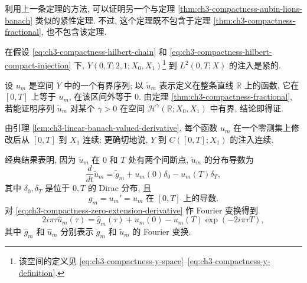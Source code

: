 利用上一条定理的方法, 可以证明另一个与定理 \ref{thm:ch3-compactness-aubin-lions-banach} 类似的紧性定理. 不过, 这个定理既不包含于定理 \ref{thm:ch3-compactness-fractional}, 也不包含该定理.

\begin{Theorem}
\label{thm:ch3-compactness-y-hilbert}
在假设 \eqref{eq:ch3-compactness-hilbert-chain} 和 \eqref{eq:ch3-compactness-hilbert-compact-injection} 下, $Y(0,T;2,1;X_0,X_1)$\footnote{该空间的定义见 \eqref{eq:ch3-compactness-y-space}--\eqref{eq:ch3-compactness-y-definition}.} 到 $L^2(0,T;X)$ 的注入是紧的.
\end{Theorem}

\begin{Proof}
设 $u_m$ 是空间 $Y$ 中的一个有界序列; 以 $\widetilde u_m$ 表示定义在整条直线 $\mathbb R$ 上的函数, 它在 $[0,T]$ 上等于 $u_m$, 在该区间外等于 $0$. 由定理 \ref{thm:ch3-compactness-fractional}, 若能证明序列 $\widetilde u_m$ 对某个 $\gamma>0$ 在空间 $\mathcal H^\gamma(\mathbb R;X_0,X_1)$ 中有界, 结论即得证.

由引理 \ref{lem:ch3-linear-banach-valued-derivative}, 每个函数 $u_m$ 在一个零测集上修改后从 $[0,T]$ 到 $X_1$ 连续; 更确切地说, $Y$ 到 $C([0,T];X_1)$ 的注入连续.

\hypertarget{chapter-03-page-203}{}
经典结果表明, 因为 $\widetilde u_m$ 在 $0$ 和 $T$ 处有两个间断点, $\widetilde u_m$ 的分布导数为
\begin{equation}
\frac d{dt}\widetilde u_m
=\widetilde g_m+u_m(0)\delta_0-u_m(T)\delta_T,
\label{eq:ch3-compactness-zero-extension-derivative}
\end{equation}
其中 $\delta_0,\delta_T$ 是位于 $0,T$ 的 Dirac 分布, 且
\begin{equation}
g_m=u_m'=u_m\text{ 在 }[0,T]\text{ 上的导数}.
\label{eq:ch3-compactness-extension-derivative-definition}
\end{equation}
对 \eqref{eq:ch3-compactness-zero-extension-derivative} 作 Fourier 变换得到
\begin{equation}
2i\pi\tau\widehat u_m(\tau)
=\widehat g_m(\tau)+u_m(0)-u_m(T)\exp(-2i\pi\tau T),
\label{eq:ch3-compactness-extension-fourier-identity}
\end{equation}
其中 $\widehat g_m$ 和 $\widehat u_m$ 分别表示 $\widetilde g_m$ 和 $\widetilde u_m$ 的 Fourier 变换.


\end{Proof}
